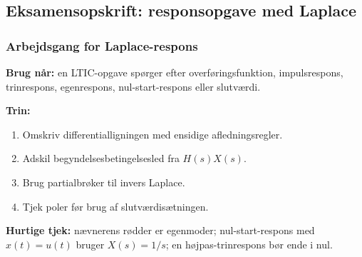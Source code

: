 \subsection{Eksamensopskrift: responsopgave med Laplace}

\subsubsection{Arbejdsgang for Laplace-respons}
\textbf{Brug når:} en LTIC-opgave spørger efter overføringsfunktion, impulsrespons, trinrespons, egenrespons, nul-start-respons eller slutværdi.

\textbf{Trin:}
\begin{enumerate}
    \item Omskriv differentialligningen med ensidige afledningsregler.
    \item Adskil begyndelsesbetingelsesled fra \(H(s)X(s)\).
    \item Brug partialbrøker til invers Laplace.
    \item Tjek poler før brug af slutværdisætningen.
\end{enumerate}

\textbf{Hurtige tjek:} nævnerens rødder er egenmoder; nul-start-respons med \(x(t)=u(t)\) bruger \(X(s)=1/s\); en højpas-trinrespons bør ende i nul.
